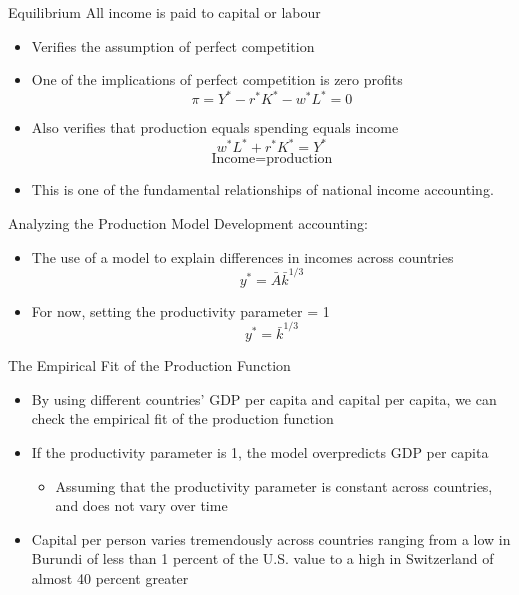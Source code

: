 \documentclass[aspectratio=1610]{beamer}
\begin{document}
\begin{frame}[wide]{Equilibrium}
	All income is paid to capital or labour
	\begin{itemize}
		\item Verifies the assumption of perfect competition
		\item One of the implications of perfect competition is zero profits
			\[\pi = Y^* - r^*K^* - w^*L^* = 0\]
		\item Also verifies that production equals spending equals income
			\[w^*L^* + r^* K^* = Y^*\]
			\[\text{Income} = \text{production}\]
		\item This is one of the fundamental relationships of national income accounting.
	\end{itemize}
\end{frame}

\begin{frame}[wide]{Analyzing the Production Model}
	Development accounting:
	\begin{itemize}
		\item The use of a model to explain differences in incomes across countries
			\[y^* = \bar{A} \bar{k}^{1/3}\]
		\item For now, setting the productivity parameter = 1
			\[y^* = \bar{k}^{1/3}\]
		
	\end{itemize}
\end{frame}

\begin{frame}[wide]{The Empirical Fit of the Production Function }
	\begin{itemize}
		\item By using different countries' GDP per capita and capital per capita, we can check the empirical fit of the production function
		\item If the productivity parameter is 1, the model overpredicts GDP per capita
		\begin{itemize}
			\item Assuming that the productivity parameter is constant across countries, and does not vary over time
		\end{itemize}
		\item Capital per person varies tremendously across countries ranging from a low in Burundi of less than 1 percent of the U.S. value to a high in Switzerland of almost 40 percent greater

	\end{itemize}
\end{frame}
\end{document}
